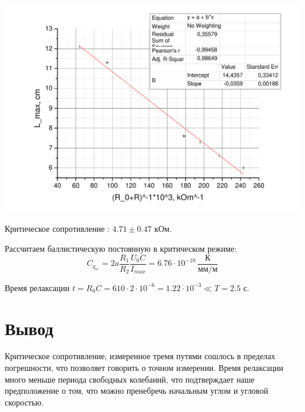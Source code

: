 \documentclass[a4paper,12pt]{article}
\begin{document}
	\includegraphics[width = 0.7\linewidth]{graph3}


	Критическое сопротивление : $4.71\pm 0.47$ кОм.




Рассчитаем баллистическую постоянную в критическом режиме: $$C_{q_{cr}} = 2a\frac{R_1}{R_2}\frac{U_0C}{I_{max}} = 6.76\cdot10^{-10}\,\frac{\text{К}}{\text{мм/м}}$$

Время релаксации $t = R_0C = 610\cdot2\cdot10^{-6}=1.22\cdot10^{-3}\ll T  = 2.5$ с. 
	\section{Вывод}
		Критическое сопротивление, измеренное тремя путями сошлось в пределах погрешности, что позволяет говорить о точном измерении. Время релаксации много меньше периода свободных колебаний, что подтверждает наше предположение о том, что можно пренебречь начальным углом и угловой скоростью.

		
\end{document}
